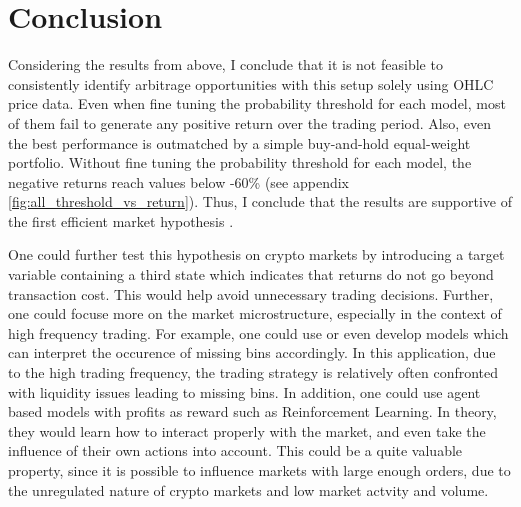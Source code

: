 \section{Conclusion}
Considering the results from above, I conclude that it is not feasible to consistently identify arbitrage opportunities with this setup
solely using OHLC price data. Even when fine tuning the probability threshold for each model, most of them fail to generate any positive return over the trading period.
Also, even the best performance is outmatched by a simple buy-and-hold equal-weight portfolio.
Without fine tuning the probability threshold for each model, the negative returns reach values below -60\% (see appendix \ref{fig:all_threshold_vs_return}).
Thus, I conclude that the results are supportive of the first efficient market hypothesis \cite{fama1970marketHypothesis}.

One could further test this hypothesis on crypto markets by introducing a target variable containing a third state 
which indicates that returns do not go beyond transaction cost. This would help avoid unnecessary trading decisions.
Further, one could focuse more on the market microstructure, especially in the context of high frequency trading.
For example, one could use or even develop models which can interpret the occurence of missing bins accordingly.
In this application, due to the high trading frequency, the trading strategy is relatively often confronted with liquidity issues leading to missing bins.
In addition, one could use agent based models with profits as reward such as Reinforcement Learning. 
In theory, they would learn how to interact properly with the market, and even take the influence of their own actions into account.
This could be a quite valuable property, since it is possible to influence markets with large enough orders,
due to the unregulated nature of crypto markets and low market actvity and volume.



